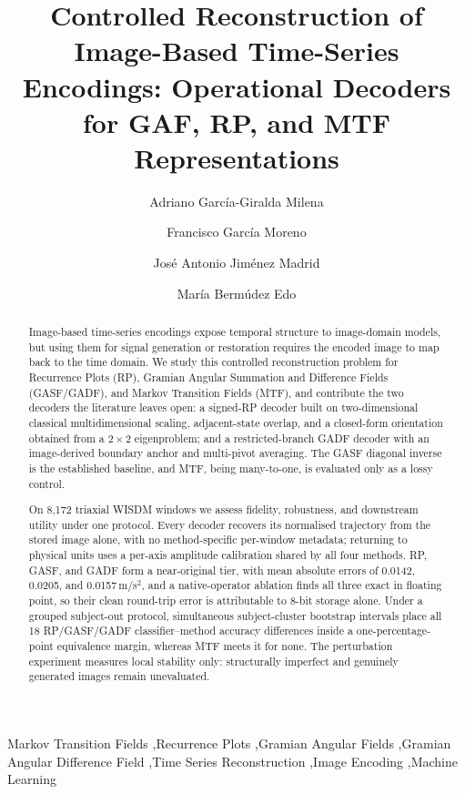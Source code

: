\documentclass[preprint,12pt]{elsarticle}
\begin{document}
\begin{frontmatter}

\title{Controlled Reconstruction of Image-Based Time-Series Encodings: Operational Decoders for GAF, RP, and MTF Representations}

\author[mydass]{Adriano García-Giralda Milena}
\author[cls]{Francisco García Moreno}
\author[alg]{José Antonio Jiménez Madrid}
\author[cls]{María Bermúdez Edo}








\begin{abstract}
Image-based time-series encodings expose temporal structure to image-domain models, but using them for signal generation or restoration requires the encoded image to map back to the time domain. We study this controlled reconstruction problem for Recurrence Plots (RP), Gramian Angular Summation and Difference Fields (GASF/GADF), and Markov Transition Fields (MTF), and contribute the two decoders the literature leaves open: a signed-RP decoder built on two-dimensional classical multidimensional scaling, adjacent-state overlap, and a closed-form orientation obtained from a $2\times2$ eigenproblem; and a restricted-branch GADF decoder with an image-derived boundary anchor and multi-pivot averaging. The GASF diagonal inverse is the established baseline, and MTF, being many-to-one, is evaluated only as a lossy control.

On 8,172 triaxial WISDM windows we assess fidelity, robustness, and downstream utility under one protocol. Every decoder recovers its normalised trajectory from the stored image alone, with no method-specific per-window metadata; returning to physical units uses a per-axis amplitude calibration shared by all four methods. RP, GASF, and GADF form a near-original tier, with mean absolute errors of 0.0142, 0.0205, and 0.0157\,m/s$^2$, and a native-operator ablation finds all three exact in floating point, so their clean round-trip error is attributable to 8-bit storage alone. Under a grouped subject-out protocol, simultaneous subject-cluster bootstrap intervals place all 18 RP/GASF/GADF classifier--method accuracy differences inside a one-percentage-point equivalence margin, whereas MTF meets it for none. The perturbation experiment measures local stability only: structurally imperfect and genuinely generated images remain unevaluated.
\end{abstract}

\begin{keyword}
Markov Transition Fields \sep Recurrence Plots \sep Gramian Angular Fields \sep Gramian Angular Difference Field \sep Time Series Reconstruction \sep Image Encoding \sep Machine Learning
\end{keyword}

\end{frontmatter}
\end{document}
